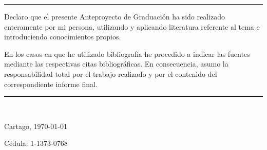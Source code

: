 \thispagestyle{empty}

\rule{10mm}{0pt}


Declaro que el presente Anteproyecto de Graduación ha sido realizado enteramente
por mi persona, utilizando y aplicando literatura referente al tema e
introduciendo conocimientos propios.

En los casos en que he utilizado bibliografía he procedido a indicar las
fuentes mediante las respectivas citas bibliográficas.  En consecuencia,
asumo la responsabilidad total por el trabajo realizado y por
el contenido del correspondiente informe final.



\vspace*{20mm}

\begin{flushright}
  \rule{40mm}{0.5pt}\\
  \scriptAuthor\par
  Cartago, \today\par
  Cédula: 1-1373-0768
\end{flushright}


